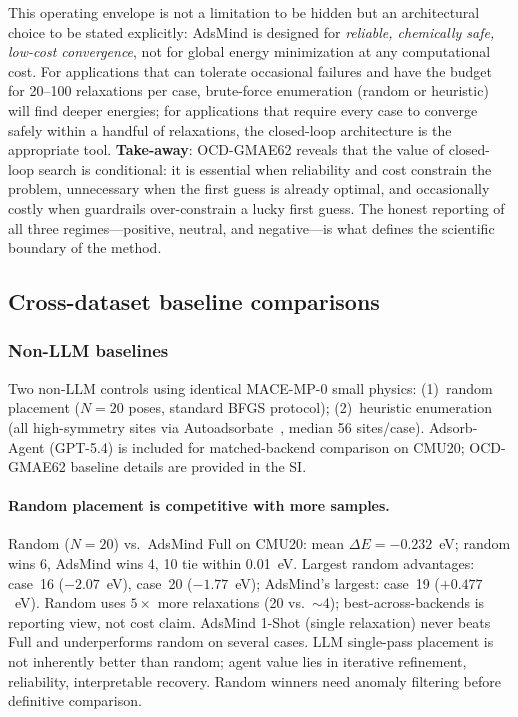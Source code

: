 This operating envelope is not a limitation to be hidden but an architectural choice to be stated explicitly: AdsMind is designed for \emph{reliable, chemically safe, low-cost convergence}, not for global energy minimization at any computational cost.
For applications that can tolerate occasional failures and have the budget for 20--100 relaxations per case, brute-force enumeration (random or heuristic) will find deeper energies; for applications that require every case to converge safely within a handful of relaxations, the closed-loop architecture is the appropriate tool.
\textbf{Take-away}: OCD-GMAE62 reveals that the value of closed-loop search is conditional: it is essential when reliability and cost constrain the problem, unnecessary when the first guess is already optimal, and occasionally costly when guardrails over-constrain a lucky first guess.
The honest reporting of all three regimes---positive, neutral, and negative---is what defines the scientific boundary of the method.


\subsection{Cross-dataset baseline comparisons}

\subsubsection{Non-LLM baselines}

Two non-LLM controls using identical MACE-MP-0 small physics: (1)~random placement ($N=20$ poses, standard BFGS protocol); (2)~heuristic enumeration (all high-symmetry sites via Autoadsorbate~\cite{fako2025simple}, median 56 sites/case).
Adsorb-Agent (GPT-5.4) is included for matched-backend comparison on CMU20; OCD-GMAE62 baseline details are provided in the SI.

\paragraph{Random placement is competitive with more samples.}
Random ($N=20$) vs.\ AdsMind Full on CMU20: mean $\Delta E = -0.232$~eV; random wins 6, AdsMind wins 4, 10 tie within 0.01~eV.
Largest random advantages: case~16 ($-2.07$~eV), case~20 ($-1.77$~eV); AdsMind's largest: case~19 ($+0.477$~eV).
Random uses $5\times$ more relaxations (20 vs.\ $\sim$4); best-across-backends is reporting view, not cost claim.
AdsMind 1-Shot (single relaxation) never beats Full and underperforms random on several cases.
LLM single-pass placement is not inherently better than random; agent value lies in iterative refinement, reliability, interpretable recovery.
Random winners need anomaly filtering before definitive comparison.

